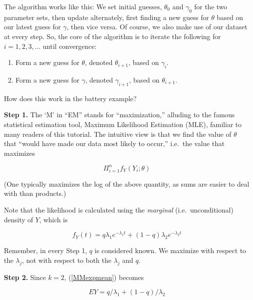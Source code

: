 \documentclass[11pt]{article}
\begin{document}
The algorithm works like this:  We set initial guesses, $\theta_0$ and
$\gamma_0$ for the two parameter sets, then update alternately, first
finding a new guess for $\theta$ based on our latest guess for $\gamma$,
then vice versa.  Of course, we also make use of our dataset at every
step.  So, the core of the algorithm is to iterate the following for
$i=1,2,3,...$ until convergence:

\begin{enumerate}

\item Form a new guess for $\theta$, denoted $\theta_{i+1}$, based
on $\gamma_i$.

\item Form a new guess for $\gamma$, denoted $\gamma_{i+1}$, based
on $\theta_{i+1}$.

\end{enumerate} 

How does this work in the battery example?  

\textbf{Step 1.}  The `M' in ``EM'' stands for ``maximization,''
alluding to the famous statistical estimation tool, Maximum Likelihood
Estimation (MLE), familiar to many readers of this tutorial.  
The intuitive view is that we find the value of $\theta$ that ``would
have made our data most likely to occur,'' i.e.\ the value that maximizes

\begin{equation}
\Pi_{i=1}^n f_{Y}(Y_i; \theta)
\end{equation}

(One typically maximizes the log of the above quantity, as sums are
easier to deal with than products.)

Note that the likelihood is calculated using the \textit{marginal}
(i.e.\ unconditional) density of $Y$, which is

\begin{equation}
f_Y(t) = q \lambda_1 e^{-\lambda_1 t} +
(1-q) \lambda_2 e^{-\lambda_2 t}
\end{equation}

Remember, in every Step 1, $q$ is considered known.  We maximize with
respect to the $\lambda_j$, not with respect to both
the $\lambda_j$ and $q$.

\textbf{Step 2.}  Since $k=2$, (\ref{MMexpmean}) becomes

\begin{equation}
\label{step2}
EY = q / \lambda_1 + (1-q) / \lambda_2
\end{equation}
\end{document}
